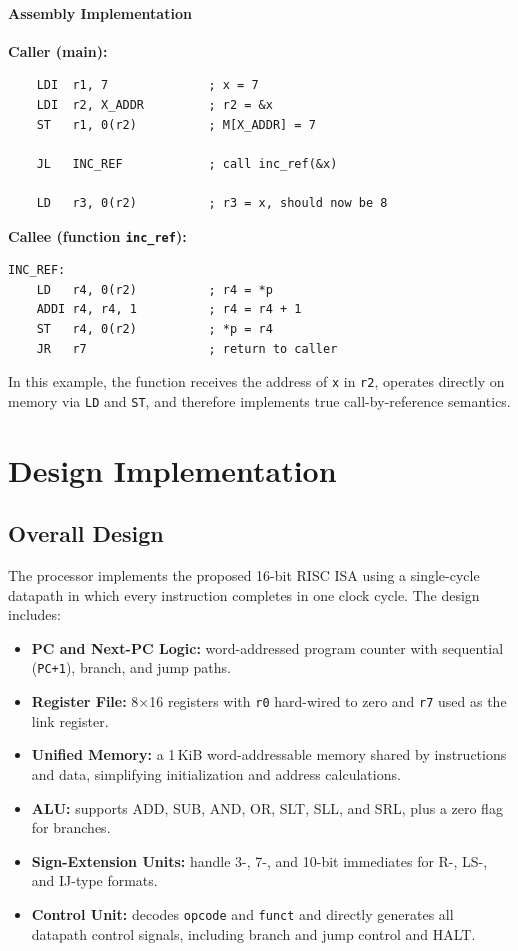 \documentclass[12pt]{report}
\begin{document}
\subsubsection*{Assembly Implementation}

\textbf{Caller (main):}
\begin{lstlisting}
    LDI  r1, 7              ; x = 7
    LDI  r2, X_ADDR         ; r2 = &x
    ST   r1, 0(r2)          ; M[X_ADDR] = 7

    JL   INC_REF            ; call inc_ref(&x)

    LD   r3, 0(r2)          ; r3 = x, should now be 8
\end{lstlisting}

\noindent \textbf{Callee (function \texttt{inc\_ref}):}
\begin{lstlisting}
INC_REF:
    LD   r4, 0(r2)          ; r4 = *p
    ADDI r4, r4, 1          ; r4 = r4 + 1
    ST   r4, 0(r2)          ; *p = r4
    JR   r7                 ; return to caller
\end{lstlisting}

In this example, the function receives the address of \texttt{x} in \texttt{r2}, operates directly on memory via \texttt{LD} and \texttt{ST}, and therefore implements true call-by-reference semantics.



\chapter{Design Implementation}
\section{Overall Design}

The processor implements the proposed 16-bit RISC ISA using a single-cycle
datapath in which every instruction completes in one clock cycle. The design
includes:

\begin{itemize}
    \item \textbf{PC and Next-PC Logic:} word-addressed program counter with
          sequential (\texttt{PC+1}), branch, and jump paths.
    \item \textbf{Register File:} 8×16 registers with \texttt{r0} hard-wired to
          zero and \texttt{r7} used as the link register.
    \item \textbf{Unified Memory:} a 1\,KiB word-addressable memory shared by
          instructions and data, simplifying initialization and address
          calculations.
    \item \textbf{ALU:} supports ADD, SUB, AND, OR, SLT, SLL, and SRL, plus a
          zero flag for branches.
    \item \textbf{Sign-Extension Units:} handle 3-, 7-, and 10-bit immediates
          for R-, LS-, and IJ-type formats.
    \item \textbf{Control Unit:} decodes \texttt{opcode} and \texttt{funct} and
          directly generates all datapath control signals, including branch and
          jump control and HALT.
\end{itemize}
\end{document}
